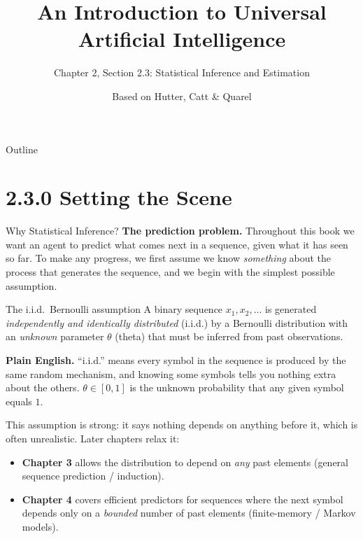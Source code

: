 \documentclass[aspectratio=169,10pt]{beamer}
\title[UAI -- Ch.2.3]{An Introduction to Universal Artificial Intelligence}
\subtitle{Chapter 2, Section 2.3: Statistical Inference and Estimation}
\author{Based on Hutter, Catt \& Quarel}
\institute{CRC Press, 2024}
\date{}
\begin{document}

\begin{frame}
  \titlepage
\end{frame}

\begin{frame}{Outline}
  \tableofcontents
\end{frame}

\section{2.3.0 Setting the Scene}

\begin{frame}[allowframebreaks]{Why Statistical Inference?}
  \textbf{The prediction problem.} Throughout this book we want an agent to
  predict what comes next in a sequence, given what it has seen so far. To make
  any progress, we first assume we know \emph{something} about the process that
  generates the sequence, and we begin with the simplest possible assumption.

  \begin{block}{The i.i.d.\ Bernoulli assumption}
    A binary sequence $x_1,x_2,\dots$ is generated \emph{independently and
    identically distributed} (i.i.d.) by a Bernoulli distribution with an
    \emph{unknown} parameter $\theta$ (theta) that must be inferred from past
    observations.
  \end{block}
  \textbf{Plain English.} ``i.i.d.'' means every symbol in the sequence is
  produced by the same random mechanism, and knowing some symbols tells you
  nothing extra about the others. $\theta \in [0,1]$ is the unknown probability
  that any given symbol equals $1$.

  \framebreak

  This assumption is strong: it says nothing depends on anything before it,
  which is often unrealistic. Later chapters relax it:
  \begin{itemize}
    \item \textbf{Chapter 3} allows the distribution to depend on \emph{any}
      past elements (general sequence prediction / induction).
    \item \textbf{Chapter 4} covers efficient predictors for sequences where
      the next symbol depends only on a \emph{bounded} number of past
      elements (finite-memory / Markov models).
  \end{itemize}


\end{frame}
\end{document}
